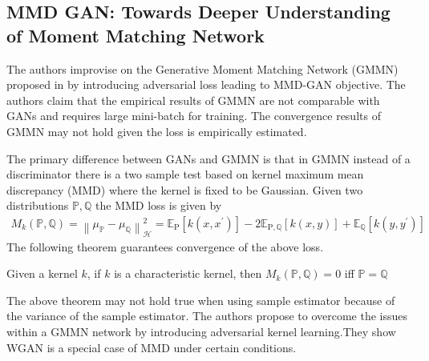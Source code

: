 \subsection*{MMD GAN: Towards Deeper Understanding of Moment Matching Network \citep{mmd-gan}}
The authors improvise on the Generative Moment Matching Network (GMMN) proposed in \citep{gmmn} by introducing adversarial loss leading to MMD-GAN objective. The authors claim that the empirical results of GMMN are not comparable with GANs and requires large mini-batch for training. The convergence results of GMMN may not hold given the loss is empirically estimated.

The primary difference between GANs and GMMN is that in GMMN instead of a  discriminator there is a two sample test based on kernel maximum mean discrepancy (MMD) where the kernel is fixed to be Gaussian. Given two distributions $\mathbb{P}, \mathbb{Q}$ the MMD loss is given by 
\begin{equation}
    \begin{aligned}
    M_{k}(\mathbb{P}, \mathbb{Q})= \left\|\mu_{\mathbb{P}}-\mu_{\mathbb{Q}}\right\|_{\mathcal{H}}^{2}
    = \mathbb{E}_{\mathrm{P}}\left[k\left(x, x^{\prime}\right)\right]-2 \mathbb{E}_{\mathrm{P}, \mathbb{Q}}[k(x, y)]+\mathbb{E}_{\mathbb{Q}}\left[k\left(y, y^{\prime}\right)\right]
    \end{aligned}
\end{equation}
The following theorem guarantees convergence of the above loss.
\begin{theorem}
Given a kernel $k$, if $k$ is a characteristic kernel, then $M_{k}(\mathbb{P}, \mathbb{Q}) = 0$ iff $\mathbb{P} = \mathbb{Q}$
\end{theorem}
The above theorem may not hold true when using sample estimator because of the variance of the sample estimator.
The authors propose to overcome the issues within a GMMN network by introducing adversarial kernel learning.They show WGAN is a special case of MMD under certain conditions.
